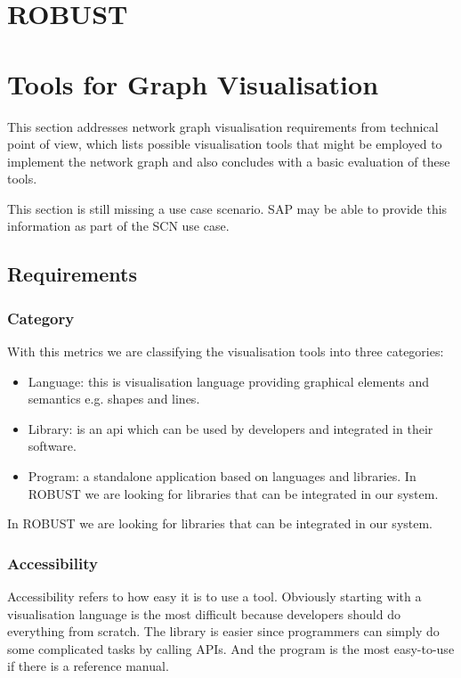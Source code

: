 \section{ROBUST}




\section{Tools for Graph Visualisation}

This section addresses network graph visualisation requirements from technical point of view, which lists possible visualisation tools that might be employed to implement the network graph and also concludes with a basic evaluation of these tools.

This section is still missing a use case scenario. SAP may be able to provide this information as part of the SCN use case.

\subsection{Requirements}

\subsubsection{Category}
With this metrics we are classifying the visualisation tools into three categories:

\begin{itemize}
  \item Language: this is visualisation language providing graphical elements and semantics e.g. shapes and lines.
  \item Library: is an api which can be used by developers and integrated in their software.
  \item Program: a standalone application based on languages and libraries.
In ROBUST we are looking for libraries that can be integrated in our system.
\end{itemize}

In ROBUST we are looking for libraries that can be integrated in our system.

\subsubsection{Accessibility}
Accessibility refers to how easy it is to use a tool. Obviously starting with a visualisation language is the most difficult because developers should do everything from scratch. The library is easier since programmers can simply do some complicated tasks by calling APIs. And the program is the most easy-to-use if there is a reference manual.

